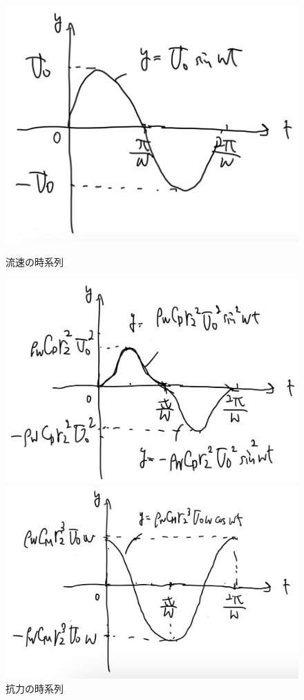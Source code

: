 \documentclass[a4paper]{jsarticle}
\begin{document}
\begin{figure}[htb]
  \begin{minipage}{0.3\hsize}
    \centering
    \includegraphics[width=\hsize]{fig1.png}
    \caption{流速の時系列}
  \end{minipage}
  \begin{minipage}{0.3\hsize}
    \centering
    \includegraphics[width=\hsize]{fig2.png}
    \caption{抗力の時系列}
  \end{minipage}
  \begin{minipage}{0.3\hsize}
    \centering
    \includegraphics[width=\hsize]{fig3.png}

\end{minipage}
\end{figure}
\end{document}
